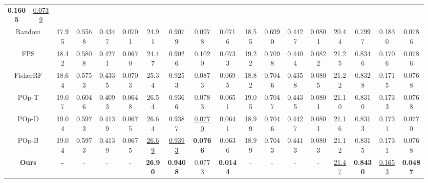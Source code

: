 \begin{table}[ht]
{{\begin{tabular}{cc|cccccccc|cccccccc}
  \textbf{0.1605} &
  \underline{0.0739} \\
  \multicolumn{2}{c|}{Random} &
  17.95 &
  0.5568 &
  0.4347 &
  \multicolumn{1}{c|}{0.0701} &
  24.91 &
  0.9079 &
  0.0978 &
  0.0716 &
  18.55 &
  0.6990 &
  0.4427 &
  \multicolumn{1}{c|}{0.0801} &
  20.44 &
  0.7997 &
  0.1830 &
  0.0786 \\
  \multicolumn{2}{c|}{FPS} &
  18.42 &
  0.5808 &
  0.4271 &
  \multicolumn{1}{c|}{0.0670} &
  24.47 &
  0.9026 &
  0.1020 &
  0.0733 &
  19.22 &
  0.7098 &
  0.4404 &
  \multicolumn{1}{c|}{0.0822} &
  21.25 &
  0.8346 &
  0.1706 &
  0.0786 \\ 
  \midrule
  \multicolumn{2}{c|}{FisherRF \cite{jiang2024fisherrf}} &
  18.64 &
  0.5753 &
  0.4335 &
  \multicolumn{1}{c|}{0.0703} &
  25.34 &
  0.9253 &
  0.0873 &
  0.0695 &
  18.82 &
  0.7046 &
  0.4358 &
  \multicolumn{1}{c|}{0.0805} &
  21.22 &
  0.8328 &
  0.1715 &
  0.0768 \\
  \multicolumn{2}{c|}{POp-T \cite{wilson2025pop}} &
  19.07 &
  0.6046 &
  0.4093 &
  \multicolumn{1}{c|}{0.0648} &
  26.54 &
  0.9366 &
  0.0783 &
  0.0651 &
  19.05 &
  0.7047 &
  0.4435 &
  \multicolumn{1}{c|}{0.0801} &
  21.10 &
  0.8310 &
  0.1733 &
  0.0768 \\
  \multicolumn{2}{c|}{POp-D \cite{wilson2025pop}} &
  19.04 &
  0.5973 &
  0.4139 &
  \multicolumn{1}{c|}{0.0675} &
  26.64 &
  0.9387 &
  \underline{0.0770} &
  0.0641 &
  18.99 &
  0.7046 &
  0.4427 &
  \multicolumn{1}{c|}{0.0801} &
  21.16 &
  0.8313 &
  0.1731 &
  0.0770 \\
  \multicolumn{2}{c|}{POp-B \cite{wilson2025pop}} &
  19.04 &
  0.5973 &
  0.4139 &
  \multicolumn{1}{c|}{0.0675} &
  \underline{26.69} &
  \underline{0.9393} &
  \textbf{0.0766} &
  0.0636 &
  18.99 &
  0.7043 &
  0.4413 &
  \multicolumn{1}{c|}{0.0803} &
  21.12 &
  0.8315 &
  0.1731 &
  0.0768 \\
  \multicolumn{2}{c|}{\textbf{Ours}} &
  \textbf{-} &
  - &
  - &
  \multicolumn{1}{c|}{-} &
  \textbf{26.90} &
  \textbf{0.9408} &
  0.0773 &
  \textbf{0.0144} &
  - &
  - &
  - &
  \multicolumn{1}{c|}{-} &
  \underline{21.47} &
  \textbf{0.8430} &
  \underline{0.1653} &
  \textbf{0.0487} \\ 
  \bottomrule
\end{tabular}
}
}
\end{table}

